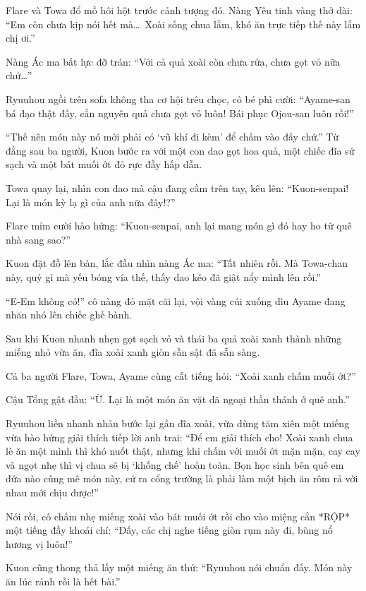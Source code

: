 \documentclass[../main.tex]{subfiles}
\begin{document}
Flare và Towa đổ mồ hôi hột trước cảnh tượng đó. Nàng Yêu tinh vàng thở dài: ``Em còn chưa kịp nói hết mà\dots\ Xoài sống chua lắm, khó ăn trực tiếp thế này lắm chị ơi.''

Nàng Ác ma bất lực đỡ trán: ``Với cả quả xoài còn chưa rửa, chưa gọt vỏ nữa chứ\dots''

Ryuuhou ngồi trên sofa không tha cơ hội trêu chọc, cô bé phì cười: ``Ayame-san bá đạo thật đấy, cắn nguyên quả chưa gọt vỏ luôn! Bái phục Ojou-san luôn rồi!''

``Thế nên món này nó mới phải có `vũ khí đi kèm' để chấm vào đấy chứ.'' Từ đằng sau ba người, Kuon bước ra với một con dao gọt hoa quả, một chiếc đĩa sứ sạch và một bát muối ớt đỏ rực đầy hấp dẫn.

Towa quay lại, nhìn con dao mà cậu đang cầm trên tay, kêu lên: ``Kuon-senpai! Lại là món kỳ lạ gì của anh nữa đây!?''

Flare mỉm cười hào hứng: ``Kuon-senpai, anh lại mang món gì đó hay ho từ quê nhà sang sao?''

Kuon đặt đồ lên bàn, lắc đầu nhìn nàng Ác ma: ``Tất nhiên rồi. Mà Towa-chan này, quỷ gì mà yếu bóng vía thế, thấy dao kéo đã giật nẩy mình lên rồi.''

``E-Em không có!'' cô nàng đỏ mặt cãi lại, vội vàng cúi xuống dìu Ayame đang nhăn nhó lên chiếc ghế bành.

\ct

Sau khi Kuon nhanh nhẹn gọt sạch vỏ và thái ba quả xoài xanh thành những miếng nhỏ vừa ăn, đĩa xoài xanh giòn sần sật đã sẵn sàng.

Cả ba người Flare, Towa, Ayame cùng cất tiếng hỏi: ``Xoài xanh chấm muối ớt?''

Cậu Tổng gật đầu: ``Ừ. Lại là một món ăn vặt dã ngoại thần thánh ở quê anh.''

Ryuuhou liền nhanh nhảu bước lại gần đĩa xoài, vừa dùng tăm xiên một miếng vừa hào hứng giải thích tiếp lời anh trai: ``Để em giải thích cho! Xoài xanh chua lè ăn một mình thì khó nuốt thật, nhưng khi chấm với muối ớt mặn mặn, cay cay và ngọt nhẹ thì vị chua sẽ bị `khống chế' hoàn toàn. Bọn học sinh bên quê em đứa nào cũng mê món này, cứ ra cổng trường là phải làm một bịch ăn rôm rả với nhau mới chịu được!''

Nói rồi, cô chấm nhẹ miếng xoài vào bát muối ớt rồi cho vào miệng cắn *RỘP* một tiếng đầy khoái chí: ``Đấy, các chị nghe tiếng giòn rụm này đi, bùng nổ hương vị luôn!''

Kuon cũng thong thả lấy một miếng ăn thử: ``Ryuuhou nói chuẩn đấy. Món này ăn lúc rảnh rỗi là hết bài.''
\end{document}
